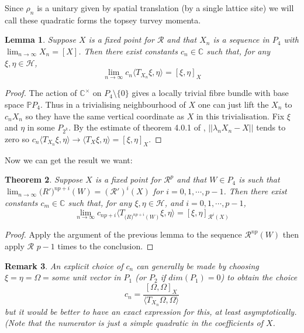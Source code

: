 \documentclass[11pt]{amsart}
\newtheorem{theorem}{Theorem}[section]
\newtheorem{lemma}[theorem]{Lemma}
\newtheorem{remark}[theorem]{Remark}
\newcommand{\1}{\mathcal I}
\newcommand{\5}{\vskip 5pt}
\begin{document}
  
  Since $\rho_n$ is a unitary given by spatial translation (by a single lattice site) we will call these quadratic forms the 
  topsey turvey momenta.
  
  
  
  \begin{lemma} Suppose $X$ is a fixed point for $\mathcal R$ and that  $X_n$ is a sequence in $P_4$ with
  $\lim_{n\rightarrow \infty} X_n= [X]$. Then there exist constants $c_n\in \mathbb C$ such that, for any $\xi,\eta\in \mathcal H$, $$\lim_{n\rightarrow \infty} c_n\langle T_{X_n}\xi,\eta\rangle=[\xi,\eta]_X$$ 
  \end{lemma} 
  \begin{proof} The action of $\mathbb C^\times$ on $P_4\setminus \{0\}$ gives a locally trivial fibre bundle with base space
  $\mathbb P P_4$. Thus in a trivialising neighbourhood of $X$ one can just lift the $X_n$ to $c_n X_n$ so they have the same
  vertical coordinate as $X$ in this trivialisation. Fix $\xi$ and $\eta$ in some $P_{2^k}$. By the estimate of theorem 4.0.1 of
  \cite{jonogo}, $||\lambda_nX_n-X||$ tends to zero so
   $c_n\langle T_{X_n}\xi,\eta\rangle\rightarrow \langle T_{X}\xi,\eta\rangle=[\xi,\eta]_X$.
  \end{proof}
  Now we can get the result we want:
  \begin{theorem}Suppose $X$ is a fixed point for $\mathcal R^p$ and that  $W\in P_4$ is such that
  $\lim_{n\rightarrow \infty} \mathcal (R')^{np+i}(W)= (\mathcal R')^i (X)$ for $i=0,1,\cdots, p-1$. Then there exist constants $c_m\in \mathbb C$ such that, for any $\xi,\eta\in \mathcal H$, and $i=0,1,\cdots, p-1$, $$\lim_{n\rightarrow \infty} c_{np+i}\langle T_{\mathcal (R)^{np+i}(W)}\xi,\eta\rangle=[\xi,\eta]_{\mathcal R^i(X)}$$ 
  
  \end{theorem}
  \begin{proof}Apply the argument of the previous lemma to the sequence $\mathcal R^{np}(W)$ then apply $\mathcal R$ $p-1$ times
  to the conclusion.
  \end{proof} 
  \begin{remark}\rm{An explicit choice of $c_n$ can generally be made by choosing $\xi=\eta=\Omega=$some unit vector
  in $P_1$ (or $P_2$ if $dim(P_1)=0$) to obtain the choice
  $$c_n=\frac{[\Omega,\Omega]_X}{\langle T_{X_n}\Omega,\Omega\rangle}$$ but it would be better to have an exact expression
  for this, at least asymptotically. (Note that the numerator is just a simple quadratic in the coefficients of $X$.}
  \end{remark} 
  
\end{document}
